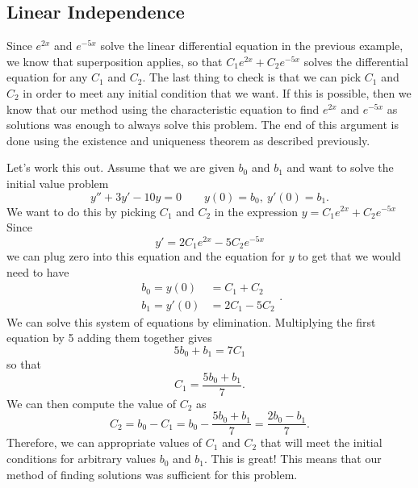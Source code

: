 \documentclass{ximera}
\begin{document}
\subsection{Linear Independence}

Since $e^{2x}$ and $e^{-5x}$ solve the linear differential equation in the previous example, we know that superposition applies, so that $C_1e^{2x} + C_2e^{-5x}$ solves the differential equation for any $C_1$ and $C_2$. The last thing to check is that we can pick $C_1$ and $C_2$ in order to meet any initial condition that we want. If this is possible, then we know that our method using the characteristic equation to find $e^{2x}$ and $e^{-5x}$ as solutions was enough to always solve this problem. The end of this argument is done using the existence and uniqueness theorem as described previously.

Let's work this out. Assume that we are given $b_0$ and $b_1$ and want to solve the initial value problem
\begin{equation*}
    y'' + 3y' - 10y = 0 \qquad y(0) = b_0,\ y'(0) = b_1.
\end{equation*}
We want to do this by picking $C_1$ and $C_2$ in the expression $y=C_1e^{2x} + C_2e^{-5x}$ Since 
\begin{equation*}
    y' = 2C_1e^{2x} - 5C_2e^{-5x}
\end{equation*}
we can plug zero into this equation and the equation for $y$ to get that we would need to have
\begin{equation*}
    \begin{split}
    b_0 = y(0) &= C_1 + C_2 \\
    b_1 = y'(0) &= 2C_1 - 5C_2
    \end{split}.
\end{equation*}
We can solve this system of equations by elimination. Multiplying the first equation by 5 adding them together gives
\begin{equation*}
    5b_0 + b_1 = 7C_1
\end{equation*}
so that
\begin{equation*}
    C_1 = \frac{5b_0 + b_1}{7}.
\end{equation*}
We can then compute the value of $C_2$ as 
\begin{equation*}
    C_2 = b_0 - C_1 = b_0 - \frac{5b_0 + b_1}{7} = \frac{2b_0 - b_1}{7}.
\end{equation*}
Therefore, we can appropriate values of $C_1$ and $C_2$ that will meet the initial conditions for arbitrary values $b_0$ and $b_1$. This is great! This means that our method of finding solutions was sufficient for this problem. 
\end{document}
